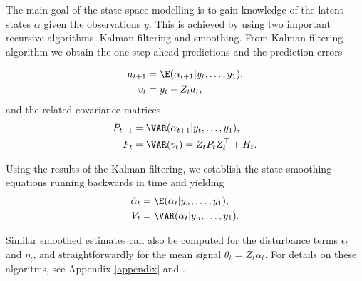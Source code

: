\documentclass[nojss,article]{jss}\usepackage[]{graphicx}\usepackage[]{color}
\begin{document}
The main goal of the state space modelling is to gain knowledge of the latent states $\alpha$ given the observations $y$. This is achieved by using two important recursive algorithms, Kalman filtering and smoothing. From Kalman filtering algorithm we obtain the one step ahead predictions and the prediction errors

\begin{equation*}
\begin{aligned}
a_{t+1} &= \E(\alpha_{t+1}|y_t,\ldots,y_1), \\
v_{t} &= y_t - Z_t a_t,
\end{aligned}
\end{equation*}
and the related covariance matrices
\begin{equation*}
\begin{aligned}
P_{t+1} &= \VAR(\alpha_{t+1}|y_t,\ldots,y_1), \\
F_{t} &= \VAR(v_t) = Z_t P_t Z_t^\top + H_t.
\end{aligned}
\end{equation*}

Using the results of the Kalman filtering, we establish the state smoothing equations running backwards in time and yielding
\begin{equation*}
\begin{aligned}
\hat\alpha_{t} &= \E(\alpha_{t}|y_n,\ldots,y_1),  \\
V_{t} &= \VAR(\alpha_{t}|y_n,\ldots,y_1).
\end{aligned}
\end{equation*}

Similar smoothed estimates can also be computed for the disturbance terms $\epsilon_t$ and $\eta_t$, and straightforwardly for the mean signal $\theta_t=Z_t\alpha_t$. For details on these algoritms, see Appendix \ref{appendix} and \citet{DK2012}.
\end{document}
